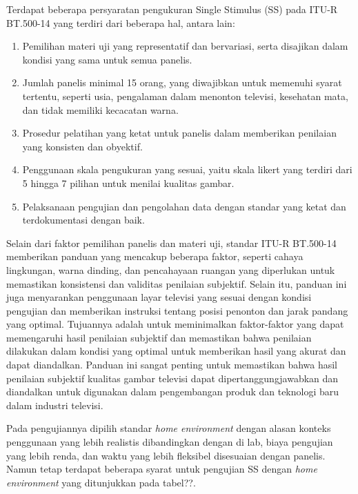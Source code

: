 Terdapat beberapa persyaratan pengukuran Single Stimulus (SS) pada ITU-R BT.500-14 yang terdiri dari beberapa hal, antara lain:

\begin{enumerate}
	\item Pemilihan materi uji yang representatif dan bervariasi, serta disajikan dalam kondisi yang sama untuk semua panelis.
	\item Jumlah panelis minimal 15 orang, yang diwajibkan untuk memenuhi syarat tertentu, seperti usia, pengalaman dalam menonton televisi, kesehatan mata, dan tidak memiliki kecacatan warna.
	\item Prosedur pelatihan yang ketat untuk panelis dalam memberikan penilaian yang konsisten dan obyektif.
	\item Penggunaan skala pengukuran yang sesuai, yaitu skala likert yang terdiri dari 5 hingga 7 pilihan untuk menilai kualitas gambar.
	\item Pelaksanaan pengujian dan pengolahan data dengan standar yang ketat dan terdokumentasi dengan baik.
\end{enumerate}

Selain dari faktor pemilihan panelis dan materi uji, standar ITU-R BT.500-14 memberikan panduan yang mencakup beberapa faktor, seperti cahaya lingkungan, warna dinding, dan pencahayaan ruangan yang diperlukan untuk  memastikan konsistensi dan validitas penilaian subjektif. Selain itu, panduan ini juga menyarankan penggunaan layar televisi yang sesuai dengan kondisi pengujian dan memberikan instruksi tentang posisi penonton dan jarak pandang yang optimal. Tujuannya adalah untuk meminimalkan faktor-faktor yang dapat memengaruhi hasil penilaian subjektif dan memastikan bahwa penilaian dilakukan dalam kondisi yang optimal untuk memberikan hasil yang akurat dan dapat diandalkan. Panduan ini sangat penting untuk memastikan bahwa hasil penilaian subjektif kualitas gambar televisi dapat dipertanggungjawabkan dan diandalkan untuk digunakan dalam pengembangan produk dan teknologi baru dalam industri televisi.

Pada pengujiannya dipilih standar \textit{home environment} dengan alasan konteks penggunaan yang lebih realistis dibandingkan dengan di lab, biaya pengujian yang lebih renda, dan waktu yang lebih fleksibel disesuaian dengan panelis. Namun tetap terdapat  beberapa syarat untuk pengujian SS dengan \textit{home environment} yang ditunjukkan pada tabel??.

